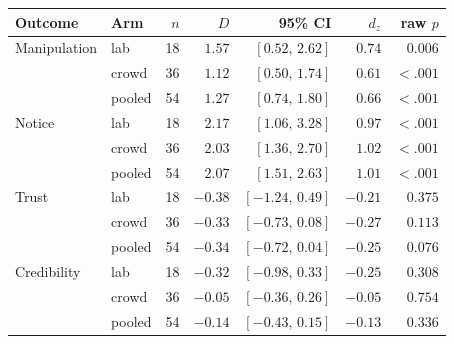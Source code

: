 \begin{tabular}{@{}l l r r r r r@{}}
\toprule
Outcome & Arm & \(n\) & \(D\) & 95\% CI & \(d_z\) & raw \(p\) \\
\midrule
Manipulation & lab & 18 & \(1.57\) & \([0.52,\,2.62]\) & \(0.74\) & \(0.006\) \\
 & crowd & 36 & \(1.12\) & \([0.50,\,1.74]\) & \(0.61\) & \(<.001\) \\
 & pooled & 54 & \(1.27\) & \([0.74,\,1.80]\) & \(0.66\) & \(<.001\) \\
\midrule
Notice & lab & 18 & \(2.17\) & \([1.06,\,3.28]\) & \(0.97\) & \(<.001\) \\
 & crowd & 36 & \(2.03\) & \([1.36,\,2.70]\) & \(1.02\) & \(<.001\) \\
 & pooled & 54 & \(2.07\) & \([1.51,\,2.63]\) & \(1.01\) & \(<.001\) \\
\midrule
Trust & lab & 18 & \(-0.38\) & \([-1.24,\,0.49]\) & \(-0.21\) & \(0.375\) \\
 & crowd & 36 & \(-0.33\) & \([-0.73,\,0.08]\) & \(-0.27\) & \(0.113\) \\
 & pooled & 54 & \(-0.34\) & \([-0.72,\,0.04]\) & \(-0.25\) & \(0.076\) \\
\midrule
Credibility & lab & 18 & \(-0.32\) & \([-0.98,\,0.33]\) & \(-0.25\) & \(0.308\) \\
 & crowd & 36 & \(-0.05\) & \([-0.36,\,0.26]\) & \(-0.05\) & \(0.754\) \\
 & pooled & 54 & \(-0.14\) & \([-0.43,\,0.15]\) & \(-0.13\) & \(0.336\) \\
\bottomrule
\end{tabular}
